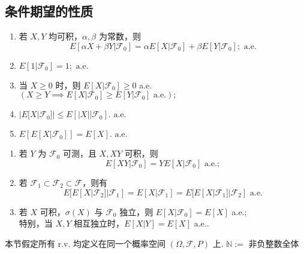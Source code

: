 \documentclass[lang=cn,10pt,thmcnt=section]{elegantbook}
\begin{document}
\subsection{条件期望的性质}
\begin{theorem}\label{1.5}
	\begin{enumerate}
		\item 若 $X, Y$ 均可积，$\alpha, \beta$ 为常数，则
		\[
		E[\alpha X + \beta Y|\mathscr{F}_0] = \alpha E[X|\mathscr{F}_0] + \beta E[Y|\mathscr{F}_0]; \text{ a.e.}
		\]
		\item $E[1|\mathscr{F}_0] = 1; \text{ a.e.}$
		\item 当 $X \geq 0$ 时，则 $E[X|\mathscr{F}_0] \geq 0$ a.e. \\
		$(X \geq Y \implies E[X|\mathscr{F}_0] \geq E[Y|\mathscr{F}_0] \text{ a.e.});$
		\item $|E[X|\mathscr{F}_0]| \leq E[|X||\mathscr{F}_0]. \text{ a.e.}$
		\item $E[E[X|\mathscr{F}_0]] = E[X]. \text{ a.e.}$
	\end{enumerate}
\end{theorem}
\begin{theorem}\label{1.6}
	\begin{enumerate}
		\item 若 $Y$ 为 $\mathscr{F}_0$ 可测，且 $X, XY$ 可积，则
		\[
		E[XY|\mathscr{F}_0] = Y E[X|\mathscr{F}_0] \text{ a.e.};
		\]
		\item 若 $\mathscr{F}_1 \subset \mathscr{F}_2 \subset \mathscr{F}$，则有
		\[
		E[E[X|\mathscr{F}_2]|\mathscr{F}_1] = E[X|\mathscr{F}_1] = E[E[X|\mathscr{F}_1]|\mathscr{F}_2] \text{ a.e.}
		\]
		\item 若 $X$ 可积，$\sigma(X)$ 与 $\mathscr{F}_0$ 独立，则 $E[X|\mathscr{F}_0] = E[X]$ a.e.; \\
		特别，当 $X, Y$ 相互独立时，$E[X|Y] = E[X]$ a.e..
	\end{enumerate}
\end{theorem}

本节假定所有 r.v. 均定义在同一个概率空间 $(\Omega, \mathcal{F}, P)$ 上. 
$\mathbb{N} :=$ 非负整数全体
\end{document}
